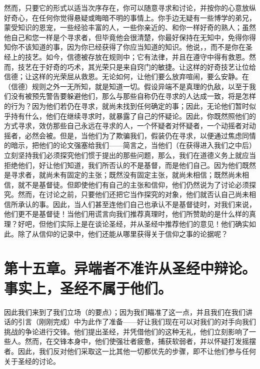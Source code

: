 然而，只要它的形式以适当次序存在，你可以随意寻求和讨论，并按你的心意放纵好奇心，在任何你觉得悬疑或晦暗不明的事情上。你手边无疑有一些博学的弟兄，蒙受知识的恩宠，一些经验丰富的人，一些你亲近的、和你一样好奇的熟人；虽然他自己和您一样是个寻求者，但毕竟他会很清楚，你最好保持在无知中，免得你得知你不该知道的事，因为你已经获得了你应当知道的知识。他说，，而不是你在圣经上的技艺。如今，信德被存放在规则中；它有法律，并且在遵守中得有救恩。然而，技艺在于好奇的巧术，其光荣只是来自窍门的敏捷。让这样的好奇技艺让位给信德；让这样的光荣屈从救恩。无论如何，让他们要么放弃喧闹，要么安静。在（信德）规则之外一无所知，就是知道一切。假设异端不是真理的仇敌，以至于我们没有被预先警告要躲避他们，那么与那些自称仍在寻求的人达成一致，将是怎样的行为？因为他们若仍在寻求，就尚未找到任何确定的事；因此，无论他们暂时似乎持有什么，他们在继续寻求时，就暴露了自己的怀疑论。因此，你既然照他们的方式寻求，效仿那些自己永远在寻求的人，一个怀疑者对怀疑者，一个动摇者对动摇者，必然会被。但是，当他们为了欺骗我们，假装仍在寻求，以便通过焦虑同情的暗示，把他们的论文强塞给我们——简言之，当他们（在获得进入我们之中后）立刻坚持我们必须探究他们惯于提出的那些问题，那么，我们在道德义务上就应当拒绝他们，好让他们知道，我们所否认的不是基督，而是他们自己。因为他们既然是寻求者，就尚未有固定的主张；既然没有固定主张，就尚未相信；既然尚未相信，就不是基督徒。但即使他们有自己的主张和信仰，他们仍然说为了讨论必须探究。然而，在讨论之前，只要他们还把它当作探究的对象，他们就否认自己尚未相信所承认的事。因此，当人们甚至连他们自己也承认不是基督徒时，对我们来说，他们更不是基督徒！当他们用谎言向我们推荐真理时，他们所赞助的是什么样的真理？好吧，但他们实际上是在谈论圣经，并从圣经中推荐他们的意见！他们确实如此。除了从信仰的记录中，他们还能从哪里获得关于信仰之事的论据呢？\par


\section{第十五章。异端者不准许从圣经中辩论。事实上，圣经不属于他们。}

因此我们来到了我们立场（的要点）；因为我们瞄准了这一点，并且我们在我们讲话的引言（刚刚完成）中为此作了准备——好让我们现在可以对我们的对手向我们挑战的争论进行交锋。他们提出圣经，并凭借他们的这种无礼，他们立刻影响了一些人。然而，在交锋本身中，他们使强壮者疲惫，捕获软弱者，并以怀疑打发摇摆者。因此，我们反对他们采取这一比其他一切都优先的步骤，即不让他们参与任何关于圣经的讨论。\par

